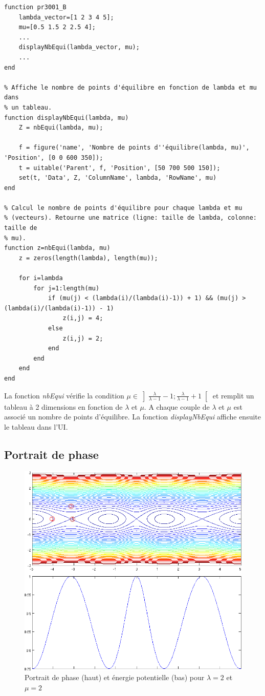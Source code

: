 \documentclass[11pt]{article}
\begin{document}
\begin{lstlisting}
function pr3001_B
	lambda_vector=[1 2 3 4 5];
	mu=[0.5 1.5 2 2.5 4];
	...
	displayNbEqui(lambda_vector, mu);
	...
end

% Affiche le nombre de points d'équilibre en fonction de lambda et mu dans
% un tableau.
function displayNbEqui(lambda, mu)
    Z = nbEqui(lambda, mu);

    f = figure('name', 'Nombre de points d''équilibre(lambda, mu)', 'Position', [0 0 600 350]);
    t = uitable('Parent', f, 'Position', [50 700 500 150]);
    set(t, 'Data', Z, 'ColumnName', lambda, 'RowName', mu)
end

% Calcul le nombre de points d'équilibre pour chaque lambda et mu
% (vecteurs). Retourne une matrice (ligne: taille de lambda, colonne: taille de
% mu).
function z=nbEqui(lambda, mu)
    z = zeros(length(lambda), length(mu));

    for i=lambda
        for j=1:length(mu)
            if (mu(j) < (lambda(i)/(lambda(i)-1)) + 1) && (mu(j) > (lambda(i)/(lambda(i)-1)) - 1)
                z(i,j) = 4;
            else
                z(i,j) = 2;
            end
        end
    end
end
\end{lstlisting}
La fonction \emph{nbEqui} vérifie la condition $\displaystyle \mu \in \left] \frac{\lambda}{\lambda - 1}-1 ; \frac{\lambda}{\lambda - 1}+1 \right[$ et remplit un tableau à 2 dimensions en fonction de $\lambda$ et $\mu$. A chaque couple de $\lambda$ et $\mu$ est associé un nombre de points d'équilibre. La fonction \emph{displayNbEqui} affiche ensuite le tableau dans l'UI.

\newpage
\subsection{Portrait de phase}
\begin{figure}[h!]
	\centering
	\includegraphics[scale=0.55]{Figures/rapport_figportraitphasemu2.png}
	\caption{Portrait de phase (haut) et énergie potentielle (bas) pour $\lambda=2$ et $\mu=2$}
	\label{fig:pp_ep_mu2}
\end{figure}
\end{document}
